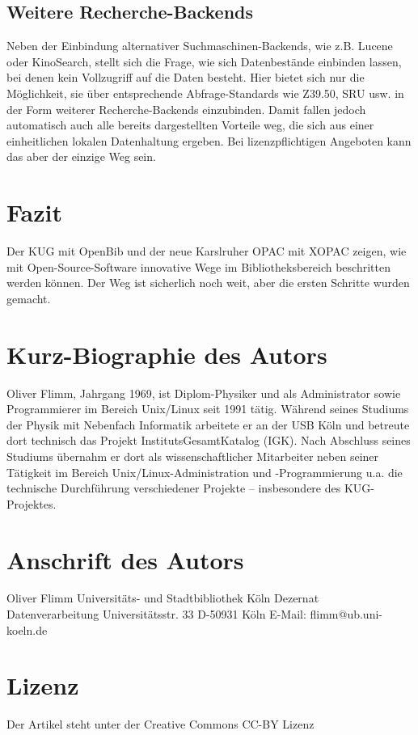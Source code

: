 \documentclass[11pt]{scrartcl}
\begin{document}
\subsection{Weitere Recherche-Backends}
Neben der Einbindung alternativer Suchmaschinen-Backends, wie
z.B. Lucene oder KinoSearch, stellt sich die Frage, wie sich
Datenbestände einbinden lassen, bei denen kein Vollzugriff auf die
Daten besteht. Hier bietet sich nur die Möglichkeit, sie über
entsprechende Abfrage-Standards wie Z39.50, SRU usw. in der Form
weiterer Recherche-Backends einzubinden. Damit fallen jedoch
automatisch auch alle bereits dargestellten Vorteile weg, die sich aus
einer einheitlichen lokalen Datenhaltung ergeben. Bei
lizenzpflichtigen Angeboten kann das aber der einzige Weg sein.

\section{Fazit}
Der KUG mit OpenBib und der neue Karslruher OPAC mit XOPAC zeigen, wie
mit Open-Source-Software innovative Wege im Bibliotheksbereich
beschritten werden können. Der Weg ist sicherlich noch weit, aber die
ersten Schritte wurden gemacht.

\newpage
\section*{Kurz-Biographie des Autors}
Oliver Flimm, Jahrgang 1969, ist Diplom-Physiker und als Administrator
sowie Programmierer im Bereich Unix/Linux seit 1991 tätig. Während
seines Studiums der Physik mit Nebenfach Informatik arbeitete er an
der USB Köln und betreute dort technisch das Projekt
InstitutsGesamtKatalog (IGK). Nach Abschluss seines Studiums übernahm
er dort als wissenschaftlicher Mitarbeiter neben seiner Tätigkeit im
Bereich Unix/Linux-Administration und -Programmierung u.a. die
technische Durchführung verschiedener Projekte -- insbesondere des
KUG-Projektes.

\section*{Anschrift des Autors}

Oliver Flimm\newline
Universitäts- und Stadtbibliothek Köln\newline
Dezernat Datenverarbeitung\newline
Universitätsstr. 33\newline
D-50931 Köln\newline
E-Mail: flimm@ub.uni-koeln.de\newline


\section*{Lizenz}

Der Artikel steht unter der Creative Commons CC-BY Lizenz
\end{document}
